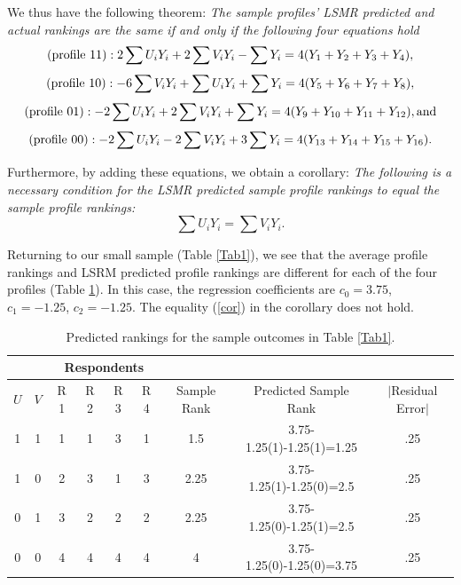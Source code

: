 \documentclass[a4paper, 12pt]{article}
\begin{document}
{\flushleft We} thus have the following theorem: \emph{The sample profiles' LSMR predicted and actual rankings are the same if and only if the following four equations hold}
\begin{equation}
\textup{(profile 11)} :  2\sum U_iY_i + 2\sum V_iY_i - \sum Y_i = 4( Y_1+Y_2+Y_3+Y_4 ),
\end{equation}
\label{eq:14}
\begin{equation}
\textup{(profile 10)} :  -6 \sum V_iY_i + \sum U_iY_i + \sum Y_i = 4( Y_5+Y_6+Y_7+Y_8 ),
\end{equation}
\label{eq:15}
\begin{equation}
\textup{(profile 01)} : -2\sum U_iY_i + 2\sum V_iY_i + \sum Y_i = 4(Y_9+Y_{10}+Y_{11}+Y_{12} ), \textup{and}
\end{equation}
\label{eq:16}
\begin{equation}
\textup{(profile 00)} : -2\sum U_iY_i - 2\sum V_iY_i +3 \sum Y_i = 4(Y_{13}+Y_{14}+Y_{15}+Y_{16} ).
\end{equation}
\label{eq:17}

{\flushleft Furthermore}, by adding these equations, we obtain a corollary:
\emph{The following is a necessary condition for the LSMR predicted sample profile rankings to equal the sample profile rankings:}
\begin{equation}
\sum U_iY_i = \sum V_iY_i.
\label{cor}
\end{equation}


Returning to our small sample (Table \ref{Tab1}), we see that the average profile rankings and LSRM predicted profile rankings are different for each of the four profiles (Table \ref{Tab9}). In this case, the regression coefficients are
$c_0=3.75$, $c_1=-1.25$, $c_2=-1.25$.  The equality (\ref{cor}) in the corollary does not hold.


\begin{table}[!htpb]
	\centering
	\scriptsize
	\begin{tabular}{cc|cccc|c|c|c}
		\multicolumn{2}{c}{} &\multicolumn{4}{c}{Respondents}\\\hline
		$U$ & $V$ & R 1&  R 2& R 3& R 4 &Sample Rank&Predicted Sample Rank& $\mid$Residual Error$|$\\  \hline
		1 &1&1&1&3&1&1.5&3.75-1.25(1)-1.25(1)=1.25&.25\\
		1 &0&2&3&1&3&2.25&3.75-1.25(1)-1.25(0)=2.5&.25 \\
		0 &1&3&2&2&2&2.25 &3.75-1.25(0)-1.25(1)=2.5&.25 \\
		0 &0&4&4&4&4&4 &3.75-1.25(0)-1.25(0)=3.75&.25\\\hline
	\end{tabular}
	\caption{{\small Predicted rankings for the sample outcomes in Table \ref{Tab1}.}}
	\label{Tab9}
\end{table}
\end{document}
